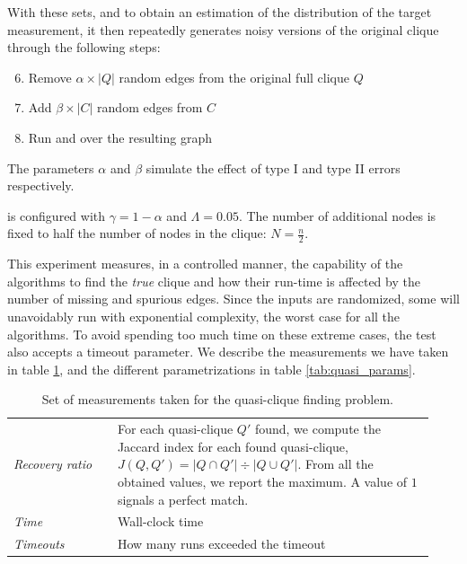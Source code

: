 With these sets, and to obtain an estimation of the distribution of the target measurement,
it then repeatedly generates noisy versions of the original clique through the following steps:

\begin{enumerate}
    \setcounter{enumi}{5}
    \item Remove $\alpha \times |Q|$ random edges from the original full clique $Q$
    \item Add $\beta \times |C|$ random edges from $C$
    \item Run \Find and \PresQ over the resulting graph
\end{enumerate}

The parameters $\alpha$ and $\beta$ simulate the effect of type I and type II errors
respectively.

\PresQ is configured with $\gamma = 1 - \alpha$ and $\Lambda = 0.05$. The number of additional nodes
is fixed to half the number of nodes in the clique: $N = \frac{n}{2}$.

This experiment measures, in a controlled manner, the capability of the
algorithms to find the \emph{true} clique and how their run-time is affected by the number of
missing and spurious edges.
Since the inputs are randomized, some will unavoidably run with exponential complexity,
the worst case for all the algorithms. To avoid spending too much time on these extreme cases,
the test also accepts a timeout parameter.
We describe the measurements we have taken in table \ref{tab:quasi_measurements}, and
the different parametrizations in table \ref{tab:quasi_params}.

\begin{table}[tbp]
    \caption{Set of measurements taken for the quasi-clique finding problem.}
    \label{tab:quasi_measurements}
    \centering
    \begin{tabular}{p{0.23\linewidth} p{0.7\linewidth}}
        \emph{Recovery ratio} & For each quasi-clique $Q'$ found, we compute the
        Jaccard index for each found quasi-clique,
        $J(Q, Q') = {|Q \cap Q'| \div |Q \cup Q'|}$.
        From all the obtained values, we report the maximum. A value of
        $1$ signals a perfect match. \\
        \emph{Time}           & Wall-clock time \\
        \emph{Timeouts}       & How many runs exceeded the timeout \\
    \end{tabular}
\end{table}

